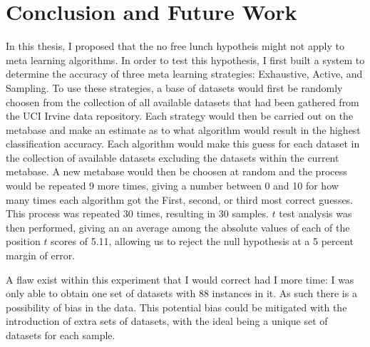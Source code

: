 \chapter{Conclusion and Future Work}
\label{Chapter5}
In this thesis, I proposed that the no free lunch hypotheis might not apply to
meta learning algorithms. In order to test this hypothesis, I first built a
system to determine the accuracy of three meta learning strategies:
Exhaustive, Active, and Sampling. To use these strategies, a base of
datasets would first be randomly choosen from the collection of all available
datasets that had been gathered from the UCI Irvine data repository.
Each strategy would then be carried out on the metabase and make an
estimate as to what algorithm would result in the highest classification
accuracy. Each algorithm would make this guess for each dataset in the
collection of available datasets excluding the datasets within the current
metabase. A new metabase would then be choosen at random and the process would be
repeated 9 more times, giving a number between 0 and 10 for how many times
each algorithm got the First, second, or third most correct guesses.
This process was repeated 30 times, resulting in 30 samples. $t$ test analysis
was then performed, giving an an average among the absolute values of each of
the position $t$ scores of 5.11, allowing us to reject the null
hypothesis at a 5 percent margin of error.

A flaw exist within this experiment that I would correct had I more time: I was
only able to obtain one set of datasets with 88 instances in it. As such there
is a possibility of bias in the data. This potential bias could be mitigated
with the introduction of extra sets of datasets, with the ideal being a unique
set of datasets for each sample.
